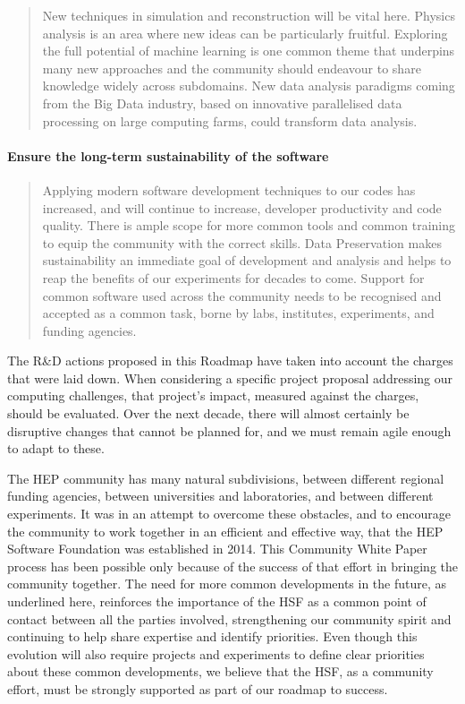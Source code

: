 \begin{quote}
New techniques in simulation and reconstruction will be vital here.
Phys\-ics analysis is an area where new ideas can be particularly
fruitful. Exploring the full potential of machine learning is one common
theme that underpins many new approaches and the community should
endeavour to share knowledge widely across subdomains. New data analysis
paradigms coming from the Big Data industry, based on innovative
parallelised data processing on large computing farms, could transform
data analysis.
\end{quote}

\paragraph{Ensure the long-term sustainability of the software}

\begin{quote}
Applying modern software development techniques to our codes has
increased, and will continue to increase, developer productivity and
code quality. There is ample scope for more common tools and common
training to equip the community with the correct skills. Data
Preservation makes sustainability an immediate goal of development and
analysis and helps to reap the benefits of our experiments for decades
to come. Support for common software used across the community needs to
be recognised and accepted as a common task, borne by labs, institutes,
experiments, and funding agencies.
\end{quote}

The R\&D actions proposed in this Roadmap have taken into account the
charges that were laid down. When considering a specific project
proposal addressing our computing challenges, that project's impact, measured
against the charges, should be evaluated. Over the next decade, there
will almost certainly be disruptive changes that cannot be planned for,
and we must remain agile enough to adapt to these.

The HEP community has many natural subdivisions, between different
regional funding agencies, between universities and laboratories, and
between different experiments. It was in an attempt to overcome these
obstacles, and to encourage the community to work together in an
efficient and effective way, that the HEP Software Foundation was
established in 2014. This Community White Paper process has been
possible only because of the success of that effort in bringing the
community together. The need for more common developments in the future,
as underlined here, reinforces the importance of the HSF as a common
point of contact between all the parties involved, strengthening our
community spirit and continuing to help share expertise and identify
priorities. Even though this evolution will also require projects and
experiments to define clear priorities about these common developments,
we believe that the HSF, as a community effort, must be strongly
supported as part of our roadmap to success.

\onecolumn
